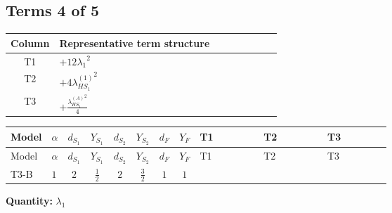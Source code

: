 \documentclass[8pt]{article}
\begin{document}
\begin{landscape}
\subsection*{Terms 4 of 5}
\begin{center}
\begin{tabular}{@{}c >{\raggedright\arraybackslash}p{0.82\linewidth}@{}}
\toprule
Column & Representative term structure \\
\midrule
T1 & \(\displaystyle +12 {\lambda_1}^2\) \\
\midrule
T2 & \(\displaystyle +4 {\lambda_{HS_1}^{(1)}}^2\) \\
\midrule
T3 & \(\displaystyle +\frac{{\lambda_{HS_1}^{(A)}}^2}{4}\) \\
\midrule
\bottomrule
\end{tabular}
\end{center}
\smallskip
\tiny
\begin{longtable}{@{}llcccccc >{\raggedright\arraybackslash}p{0.21\linewidth} >{\raggedright\arraybackslash}p{0.21\linewidth} >{\raggedright\arraybackslash}p{0.21\linewidth}@{}}
\toprule
Model & $\alpha$ & $d_{S_1}$ & $Y_{S_1}$ & $d_{S_2}$ & $Y_{S_2}$ & $d_F$ & $Y_F$ & T1 & T2 & T3 \\
\midrule
\endfirsthead
\toprule
Model & $\alpha$ & $d_{S_1}$ & $Y_{S_1}$ & $d_{S_2}$ & $Y_{S_2}$ & $d_F$ & $Y_F$ & T1 & T2 & T3 \\
\midrule
\endhead
T3-B & $1$ & $2$ & $\frac{1}{2}$ & $2$ & $\frac{3}{2}$ & $1$ & $1$ & \scriptsize\adjustbox{max width=\linewidth}{$\begin{gathered} +12 {\lambda_1}^2\end{gathered}$} & \scriptsize\adjustbox{max width=\linewidth}{$\begin{gathered} +4 {\lambda_{HS_1}^{(1)}}^2\end{gathered}$} & \scriptsize\adjustbox{max width=\linewidth}{$\begin{gathered} +\frac{{\lambda_{HS_1}^{(A)}}^2}{4}\end{gathered}$} \\
\midrule
\bottomrule
\end{longtable}
\clearpage
\noindent\textbf{Quantity: }$\lambda_1$\par\smallskip

\end{landscape}
\end{document}
